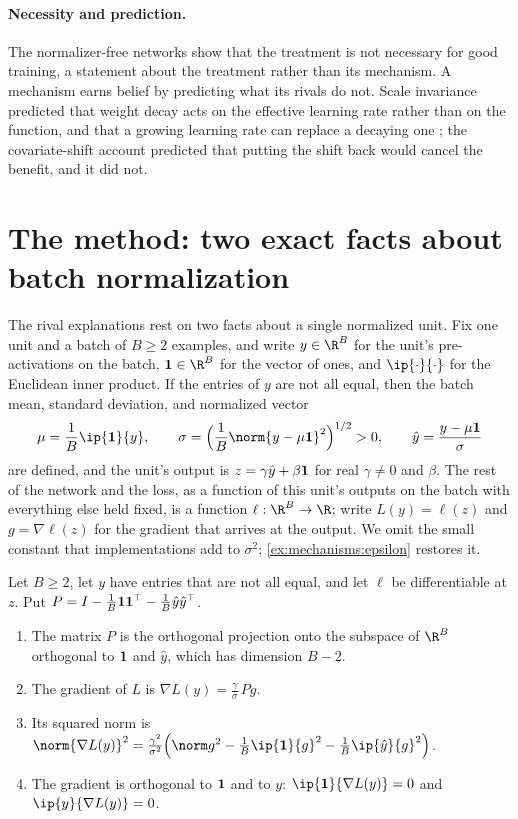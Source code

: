 \begin{refsection}
\paragraph{Necessity and prediction.} The normalizer-free networks show that the treatment is not necessary for good training, a statement about the treatment rather than its mechanism. A mechanism earns belief by predicting what its rivals do not. Scale invariance predicted that weight decay acts on the effective learning rate rather than on the function, and that a growing learning rate can replace a decaying one \parencite{vanLaarhoven2017,LiArora2020}; the covariate-shift account predicted that putting the shift back would cancel the benefit, and it did not.

\section{The method: two exact facts about batch normalization}\label{sec:mechanisms:bn}

The rival explanations rest on two facts about a single normalized unit. Fix one unit and a batch of $B\ge2$ examples, and write $y\in\R^B$ for the unit's pre-activations on the batch, $\mechanismsones\in\R^B$ for the vector of ones, and $\ip{\cdot}{\cdot}$ for the Euclidean inner product. If the entries of $y$ are not all equal, then the batch mean, standard deviation, and normalized vector
\[
\mu=\frac1B\ip{\mechanismsones}{y},\qquad\sigma=\Bigl(\frac1B\norm{y-\mu\mechanismsones}^2\Bigr)^{1/2}>0,\qquad\hat y=\frac{y-\mu\mechanismsones}{\sigma}
\]
are defined, and the unit's output is $z=\gamma\hat y+\beta\mathbf{1}$ for real $\gamma\neq0$ and $\beta$. The rest of the network and the loss, as a function of this unit's outputs on the batch with everything else held fixed, is a function $\ell:\R^B\to\R$; write $L(y)=\ell(z)$ and $g=\nabla\ell(z)$ for the gradient that arrives at the output. We omit the small constant that implementations add to $\sigma^2$; \cref{ex:mechanisms:epsilon} restores it.

\begin{theorem}\label{thm:mechanisms:jacobian}
Let $B\ge2$, let $y$ have entries that are not all equal, and let $\ell$ be differentiable at $z$. Put $P=I-\frac1B\mathbf{1}\mathbf{1}^\top-\frac1B\hat y\hat y^\top$.
\begin{enumerate}
\item The matrix $P$ is the orthogonal projection onto the subspace of $\R^B$ orthogonal to $\mathbf{1}$ and $\hat y$, which has dimension $B-2$.
\item The gradient of $L$ is $\nabla L(y)=\frac\gamma\sigma\,Pg$.
\item Its squared norm is $\norm{\nabla L(y)}^2=\frac{\gamma^2}{\sigma^2}\Bigl(\norm g^2-\frac1B\ip{\mechanismsones}{g}^2-\frac1B\ip{\hat y}{g}^2\Bigr)$.
\item The gradient is orthogonal to $\mathbf{1}$ and to $y$: $\ip{\mechanismsones}{\nabla L(y)}=0$ and $\ip{y}{\nabla L(y)}=0$.
\end{enumerate}
\end{theorem}


\end{refsection}
